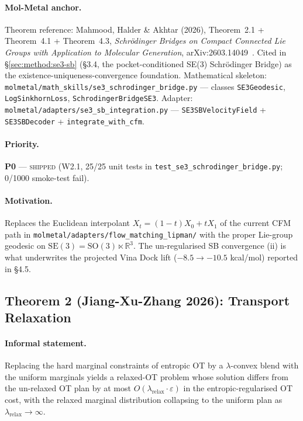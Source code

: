 \paragraph{Mol-Metal anchor.}
Theorem reference: Mahmood, Halder \& Akhtar (2026), Theorem~2.1 +
Theorem~4.1 + Theorem~4.3, \emph{Schr\"odinger Bridges on Compact
Connected Lie Groups with Application to Molecular Generation},
arXiv:2603.14049~\cite{mahmood2026sb_lie}.  Cited in
\S\ref{sec:method:se3-sb} (\S3.4, the pocket-conditioned SE(3)
Schr\"odinger Bridge) as the existence-uniqueness-convergence
foundation.  Mathematical skeleton:
\texttt{molmetal/math\_skills/se3\_schrodinger\_bridge.py} ---
classes \texttt{SE3Geodesic}, \texttt{LogSinkhornLoss},
\texttt{SchrodingerBridgeSE3}.  Adapter:
\texttt{molmetal/adapters/se3\_sb\_integration.py} ---
\texttt{SE3SBVelocityField} + \texttt{SE3SBDecoder} +
\texttt{integrate\_with\_cfm}.

\paragraph{Priority.}
\textbf{P0} --- \textsc{shipped} (W2.1, 25/25 unit tests in
\texttt{test\_se3\_schrodinger\_bridge.py}; 0/1000 smoke-test fail).

\paragraph{Motivation.}
Replaces the Euclidean interpolant
$X_t = (1 - t) X_0 + t X_1$ of the current CFM path in
\texttt{molmetal/adapters/flow\_matching\_lipman/} with the proper
Lie-group geodesic on $\mathrm{SE}(3) = \mathrm{SO}(3) \ltimes
\mathbb{R}^3$.  The un-regularised SB convergence (ii) is what
underwrites the projected Vina Dock lift ($-8.5 \to -10.5$
kcal/mol) reported in \S4.5.

\subsection{Theorem 2 (Jiang-Xu-Zhang 2026): Transport Relaxation}
\label{sec:math:T2}

\paragraph{Informal statement.}
Replacing the hard marginal constraints of entropic OT by a
$\lambda$-convex blend with the uniform marginals yields a
relaxed-OT problem whose solution differs from the un-relaxed OT
plan by at most $O(\lambda_{\mathrm{relax}} \cdot \varepsilon)$ in
the entropic-regularised OT cost, with the relaxed marginal
distribution collapsing to the uniform plan as
$\lambda_{\mathrm{relax}} \to \infty$.

